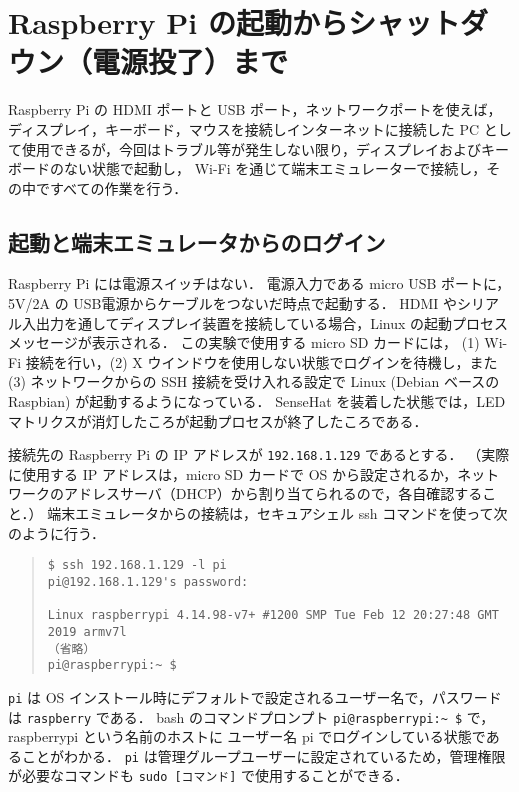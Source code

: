 \documentclass[11pt,a4,epsf]{report}
\begin{document}
\section{Raspberry Pi の起動からシャットダウン（電源投了）まで}

Raspberry Pi の HDMI ポートと USB ポート，ネットワークポートを使えば，ディスプレイ，キーボード，マウスを接続しインターネットに接続した PC として使用できるが，今回はトラブル等が発生しない限り，ディスプレイおよびキーボードのない状態で起動し，
Wi-Fi を通じて端末エミュレーターで接続し，その中ですべての作業を行う．

\subsection{起動と端末エミュレータからのログイン}

Raspberry Pi には電源スイッチはない．
電源入力である micro USB ポートに，5V/2A の USB電源からケーブルをつないだ時点で起動する．
HDMI やシリアル入出力を通してディスプレイ装置を接続している場合，Linux の起動プロセスメッセージが表示される．
この実験で使用する micro SD カードには， (1)  Wi-Fi 接続を行い，(2) X ウインドウを使用しない状態でログインを待機し，また (3) ネットワークからの SSH 接続を受け入れる設定で Linux (Debian ベースの Raspbian) が起動するようになっている．
SenseHat を装着した状態では，LED マトリクスが消灯したころが起動プロセスが終了したころである．

接続先の Raspberry Pi の IP アドレスが \verb+192.168.1.129+ であるとする．
（実際に使用する IP アドレスは，micro SD カードで OS から設定されるか，ネットワークのアドレスサーバ（DHCP）から割り当てられるので，各自確認すること．）
端末エミュレータからの接続は，セキュアシェル ssh コマンドを使って次のように行う．
\begin{quote}
\small
\begin{verbatim}
$ ssh 192.168.1.129 -l pi
pi@192.168.1.129's password: 

Linux raspberrypi 4.14.98-v7+ #1200 SMP Tue Feb 12 20:27:48 GMT 2019 armv7l
（省略）
pi@raspberrypi:~ $ 
\end{verbatim}
\end{quote}
\verb+pi+ は OS インストール時にデフォルトで設定されるユーザー名で，パスワードは \verb+raspberry+ である．
bash のコマンドプロンプト \verb+pi@raspberrypi:~ $+ で，raspberrypi という名前のホストに ユーザー名 pi でログインしている状態であることがわかる．
\verb+pi+ は管理グループユーザーに設定されているため，管理権限が必要なコマンドも \verb+sudo [コマンド]+ で使用することができる．
\end{document}
